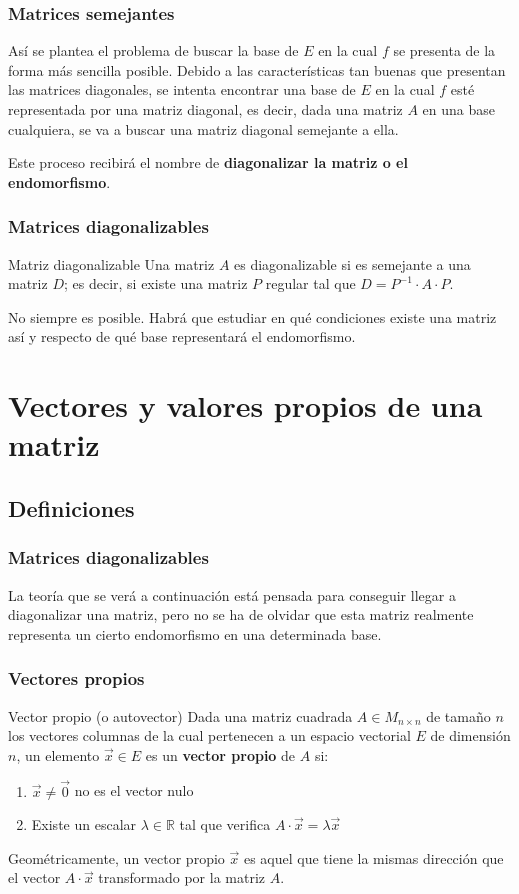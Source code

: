 \documentclass{beamer}
\begin{document}
\begin{frame}
\frametitle{Matrices semejantes}
As\'i se plantea el problema de buscar la base de $E$ en la cual $f$ se presenta de la forma m\'as sencilla posible. Debido a las caracter\'isticas tan buenas que presentan las matrices diagonales, se intenta encontrar una base de $E$ en la cual $f$ est\'e representada por una matriz diagonal, es decir, dada una matriz $A$ en una base cualquiera, se va a buscar una matriz diagonal semejante a ella. 

Este proceso recibir\'a el nombre de \textbf{diagonalizar la matriz o el endomorfismo}. 
\end{frame}


\begin{frame}
\frametitle{Matrices diagonalizables}
\begin{block}{Matriz diagonalizable}
Una matriz $A$ es diagonalizable si es semejante a una matriz $D$; es decir, si existe una matriz $P$ regular tal que $D=P^{-1}\cdot A \cdot P$.

No siempre es posible. Habr\'a que estudiar en qu\'e condiciones existe una matriz as\'i y respecto de qu\'e base representar\'a el endomorfismo.
\end{block}
\end{frame}


\section{Vectores y valores propios de una matriz}

\subsection{Definiciones}
\begin{frame}
\frametitle{Matrices diagonalizables}
La teor\'ia que se ver\'a a continuaci\'on est\'a pensada para conseguir llegar a diagonalizar una matriz, pero no se ha de olvidar que esta matriz realmente representa un cierto endomorfismo en una determinada base.
\end{frame}

\begin{frame}
\frametitle{Vectores propios}
\begin{block}{Vector propio (o autovector)}
Dada una matriz cuadrada $A\in M_{n\times n}$ de tama\~no $n$ los vectores columnas de la cual pertenecen a un espacio vectorial $E$ de dimensi\'on $n$, un elemento $\vec x \in E$ es un \textbf{vector propio} de $A$ si:
\begin{enumerate}
\item $\vec x \neq \vec 0$ no es el vector nulo
\item Existe un escalar $\lambda \in \mathbb R$ tal que verifica $A\cdot \vec x = \lambda \vec x$
\end{enumerate}
\end{block}

Geom\'etricamente, un vector propio $\vec x$ es aquel que tiene la mismas direcci\'on que el vector $A\cdot \vec x$ transformado por la matriz $A$. 
\end{frame}
\end{document}
